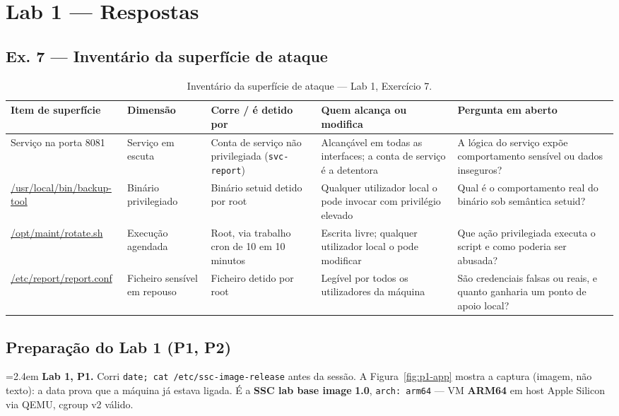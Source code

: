 \documentclass[a4paper,11pt]{article}
\newenvironment{answer}[1]{%
  \par\addvspace{7pt}\noindent
  \hangindent=2.4em\hangafter=1
  {\color{sscnblue}\bfseries #1\hspace{0.55em}}\ignorespaces}
  {\par\addvspace{5pt}}
\newcommand{\cmd}[1]{\textcolor{sscnblue}{\texttt{#1}}}
\begin{document}
\section{Lab 1 --- Respostas}
\subsection{Ex. 7 --- Invent\'ario da superf\'icie de ataque}
\begin{table}[H]
\centering
\caption{Invent\'ario da superf\'icie de ataque --- Lab 1, Exerc\'icio 7.}
\label{tab:inventario-lab1}
\footnotesize
\setlength{\tabcolsep}{5pt}
\renewcommand{\arraystretch}{1.3}
\begin{tabularx}{\textwidth}{@{}>{\raggedright\arraybackslash}p{3.1cm} >{\raggedright\arraybackslash}X >{\raggedright\arraybackslash}X >{\raggedright\arraybackslash}X >{\raggedright\arraybackslash}X@{}}
\toprule
\textbf{Item de superf\'icie} & \textbf{Dimens\~ao} & \textbf{Corre / \'e detido por} &
\textbf{Quem alcan\c{c}a ou modifica} & \textbf{Pergunta em aberto} \\
\midrule
\rowcolor{sscbg}
Servi\c{c}o na porta 8081 & Servi\c{c}o em escuta & Conta de servi\c{c}o n\~ao privilegiada (\cmd{svc-report})
      & Alcan\c{c}\'{a}vel em todas as interfaces; a conta de servi\c{c}o \'e a detentora
      & A l\'ogica do servi\c{c}o exp\~oe comportamento sens\'ivel ou dados inseguros? \\
\url{/usr/local/bin/backup-tool} & Bin\'ario privilegiado & Bin\'ario setuid detido por root
      & Qualquer utilizador local o pode invocar com privil\'egio elevado
      & Qual \'e o comportamento real do bin\'ario sob sem\^antica setuid? \\
\rowcolor{sscbg}
\url{/opt/maint/rotate.sh} & Execu\c{c}\~ao agendada & Root, via trabalho cron de 10 em 10 minutos
      & Escrita livre; qualquer utilizador local o pode modificar
      & Que a\c{c}\~ao privilegiada executa o script e como poderia ser abusada? \\
\url{/etc/report/report.conf} & Ficheiro sens\'ivel em repouso & Ficheiro detido por root
      & Leg\'ivel por todos os utilizadores da m\'aquina
      & S\~ao credenciais falsas ou reais, e quanto ganharia um ponto de apoio local? \\
\bottomrule
\end{tabularx}
\end{table}

\subsection{Prepara\c{c}\~ao do Lab 1 (P1, P2)}
\begin{answer}{Lab 1, P1.}
Corri \cmd{date; cat /etc/ssc-image-release} antes da sess\~ao. A Figura~\ref{fig:p1-app}
mostra a captura (imagem, n\~ao texto): a data prova que a m\'aquina j\'a estava ligada.
\'E a \textbf{SSC lab base image} \textbf{1.0}, \cmd{arch: arm64} --- VM \textbf{ARM64}
em host Apple Silicon via QEMU, cgroup v2 v\'alido.
\end{answer}
\end{document}
